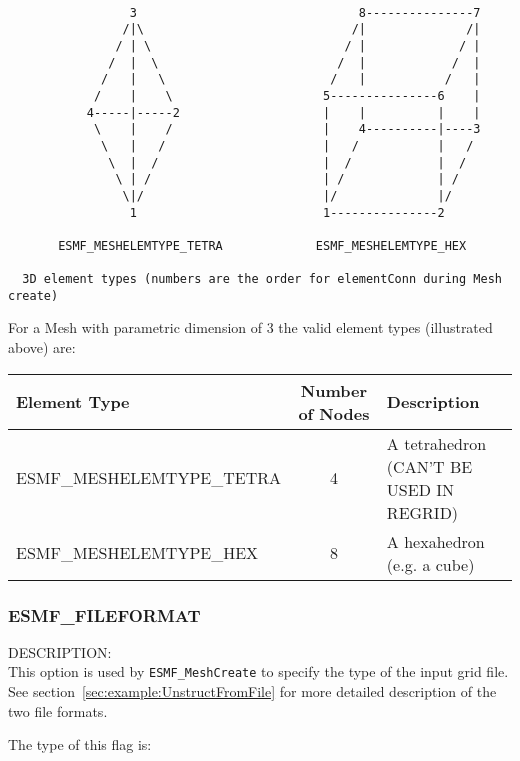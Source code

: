 \begin{verbatim}
                                            
                 3                               8---------------7
                /|\                             /|              /|
               / | \                           / |             / |
              /  |  \                         /  |            /  |
             /   |   \                       /   |           /   |
            /    |    \                     5---------------6    |
           4-----|-----2                    |    |          |    |
            \    |    /                     |    4----------|----3
             \   |   /                      |   /           |   /
              \  |  /                       |  /            |  /
               \ | /                        | /             | /
                \|/                         |/              |/
                 1                          1---------------2

       ESMF_MESHELEMTYPE_TETRA             ESMF_MESHELEMTYPE_HEX  

  3D element types (numbers are the order for elementConn during Mesh create)

\end{verbatim}

For a Mesh with parametric dimension of 3 the valid element types (illustrated above) are:

\smallskip

\begin{tabular}{|l|c|l|}
\hline
Element Type & Number of Nodes & Description \\
\hline
ESMF\_MESHELEMTYPE\_TETRA & 4 & A tetrahedron (CAN'T BE USED IN REGRID) \\
ESMF\_MESHELEMTYPE\_HEX  & 8 & A hexahedron (e.g. a cube) \\
\hline
\end{tabular}

\subsubsection{ESMF\_FILEFORMAT}
\label{const:fileformat}

{\sf DESCRIPTION:\\}
This option is used by {\tt ESMF\_MeshCreate} to specify the type of the input grid file.  See 
section~\ref{sec:example:UnstructFromFile} for more detailed description of the two file formats.

The type of this flag is:

